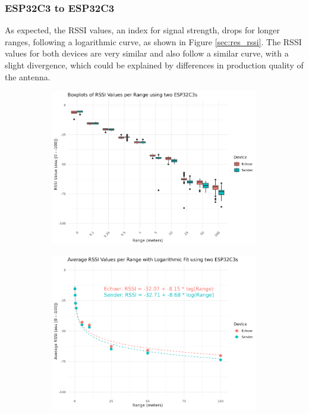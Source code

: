 \subsubsection{ESP32C3 to ESP32C3}

As expected, the RSSI values, an index for signal strength, drops for longer ranges, following a logarithmic curve, as shown in Figure \ref{sec:res_rssi}. The RSSI values for both devices are very similar and also follow a similar curve, with a slight divergence, which could be explained by differences in production quality of the antenna.

\begin{figure}[H]
    \centering
    \begin{subfigure}{0.45\textwidth}
        \includegraphics[width=\linewidth]{rstudio/analysis/plots/ESP32C3_rssi_box.png}
    \end{subfigure}
    \begin{subfigure}{0.45\textwidth}
        \includegraphics[width=\linewidth]{rstudio/analysis/plots/ESP32C3_avg_rssi.png}
    \end{subfigure}


\end{figure}
